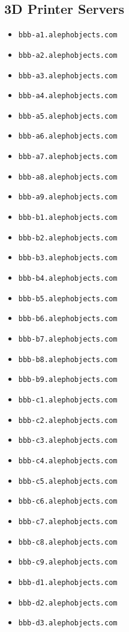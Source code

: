 \subsection{3D Printer Servers}
\begin{itemize}
\item \texttt{bbb-a1.alephobjects.com}
\item \texttt{bbb-a2.alephobjects.com}
\item \texttt{bbb-a3.alephobjects.com}
\item \texttt{bbb-a4.alephobjects.com}
\item \texttt{bbb-a5.alephobjects.com}
\item \texttt{bbb-a6.alephobjects.com}
\item \texttt{bbb-a7.alephobjects.com}
\item \texttt{bbb-a8.alephobjects.com}
\item \texttt{bbb-a9.alephobjects.com}
\item \texttt{bbb-b1.alephobjects.com}
\item \texttt{bbb-b2.alephobjects.com}
\item \texttt{bbb-b3.alephobjects.com}
\item \texttt{bbb-b4.alephobjects.com}
\item \texttt{bbb-b5.alephobjects.com}
\item \texttt{bbb-b6.alephobjects.com}
\item \texttt{bbb-b7.alephobjects.com}
\item \texttt{bbb-b8.alephobjects.com}
\item \texttt{bbb-b9.alephobjects.com}
\item \texttt{bbb-c1.alephobjects.com}
\item \texttt{bbb-c2.alephobjects.com}
\item \texttt{bbb-c3.alephobjects.com}
\item \texttt{bbb-c4.alephobjects.com}
\item \texttt{bbb-c5.alephobjects.com}
\item \texttt{bbb-c6.alephobjects.com}
\item \texttt{bbb-c7.alephobjects.com}
\item \texttt{bbb-c8.alephobjects.com}
\item \texttt{bbb-c9.alephobjects.com}
\item \texttt{bbb-d1.alephobjects.com}
\item \texttt{bbb-d2.alephobjects.com}
\item \texttt{bbb-d3.alephobjects.com}

\end{itemize}
